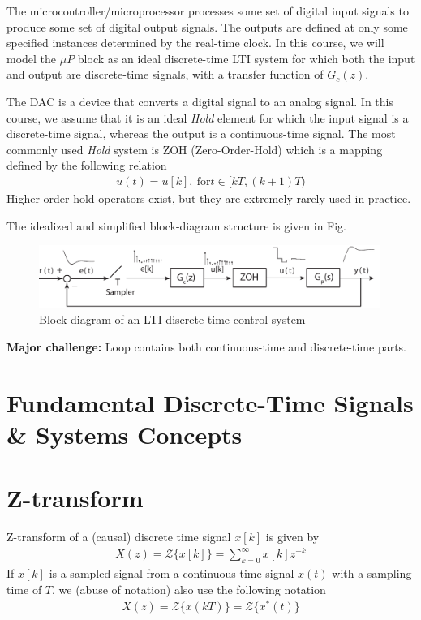 \documentclass[twoside]{article}
\begin{document}
The microcontroller/microprocessor processes some set of digital input signals to produce some set of digital output signals. The outputs are defined at only some specified instances determined by the real-time clock. In this course, we will model the $\mu P$ block as an ideal discrete-time LTI system for which both the input and output are discrete-time signals, with a transfer function of $G_c(z)$.

The DAC is a device that converts a digital signal to an analog signal. In this course, we assume that it is an ideal \textit{Hold} element for which the input signal is a discrete-time signal, whereas the output is a continuous-time signal. The most commonly used \textit{Hold} system is ZOH (Zero-Order-Hold) which is a mapping  defined by the following relation
%
\begin{align*}
  u(t) = u[k] , \ \mathrm{for} t \in [kT , (k+1)T )
\end{align*}
%
Higher-order hold operators exist, but they are extremely rarely used in practice. 

The idealized and simplified block-diagram structure is given in Fig.

\begin{figure}[h]
    \centering
      \includegraphics[width=0.99\textwidth]{idealblock}
    \caption{Block diagram of an LTI discrete-time control system}
    \label{fig:introblock}
\end{figure}

\textbf{Major challenge:} Loop contains both continuous-time and discrete-time parts.

\newpage

\section*{Fundamental Discrete-Time Signals \& Systems Concepts}

\section*{Z-transform}
%
Z-transform of a (causal) discrete time signal $x[k]$ is given by 
%
\begin{align*}
  X(z) = \mathcal{Z} \lbrace x[k] \rbrace = \sum\limits_{k=0}^{\infty} x[k] z^{-k} 
\end{align*}
%
If $x[k]$ is a sampled signal from a continuous time signal $x(t)$
with a sampling time of $T$, we (abuse of notation) also use the
following notation
%
\begin{align*}
  X(z) = \mathcal{Z} \lbrace x(kT) \rbrace = \mathcal{Z} \lbrace x^*(t) \rbrace 
\end{align*}
% 
\end{document}
